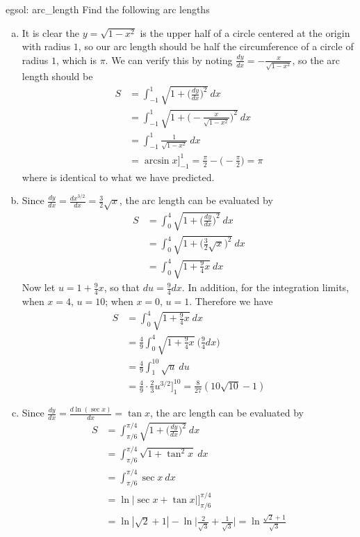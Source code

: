 \begin{egsol}[]{egsol: arc_length}
    Find the following arc lengths
    \begin{enumerate}[a)]
        \item It is clear the $y = \sqrt{1-x^2}$ is the upper half of a circle centered at the origin with radius $1$, so our arc length should be half the circumference of a circle of radius $1$, which is $\pi$.  We can verify this by noting $\frac{dy}{dx} = -\frac{x}{\sqrt{1-x^2}}$, so the arc length should be
        \begin{align*}
            S &= \int_{-1}^1 \sqrt{1+\Big(\frac{dy}{dx}\Big)^2}~dx\\
            &= \int_{-1}^1 \sqrt{1+\Big(-\frac{x}{\sqrt{1-x^2}}\Big)^2}~dx\\
            &= \int_{-1}^1 \frac{1}{\sqrt{1-x^2}}~dx\\
            &= \arcsin x\Big]_{-1}^1 = \frac{\pi}{2} - \Big(-\frac{\pi}{2}\Big) = \pi
        \end{align*}
        where is identical to what we have predicted.
        \item Since $\frac{dy}{dx} = \frac{d x^{3/2}}{dx} = \frac{3}{2} \sqrt{x}$, the arc length can be evaluated by
        \begin{align*}
            S &= \int_0^4\sqrt{1+\Big(\frac{dy}{dx}\Big)^2}~dx\\
            &= \int_0^4\sqrt{1+\big(\frac{3}{2}\sqrt{x}\big)^2}~dx\\
            &= \int_0^4\sqrt{1+\frac{9}{4}x}~dx
        \end{align*}
        Now let $u = 1+\frac{9}{4}x$, so that $du = \frac{9}{4}dx$.  In addition, for the integration limits, when $x = 4$, $u = 10$; when $x = 0$, $u = 1$.  Therefore we have
        \begin{align*}
            S &= \int_0^4\sqrt{1+\frac{9}{4}x}~dx\\
            &=\frac{4}{9} \int_0^4\sqrt{1+\frac{9}{4}x}~\Big(\frac{9}{4}dx\Big)\\
            &=\frac{4}{9}  \int_1^{10}\sqrt{u}~du\\
            &= \frac{4}{9}\cdot \frac{2}{3}u^{3/2}\Big]_1^{10} = \frac{8}{27}(10\sqrt{10}-1)
        \end{align*}
        \item Since $\frac{dy}{dx} = \frac{d \ln(\sec x)}{dx} = \tan x$, the arc length can be evaluated by
        \begin{align*}
            S &= \int_{\pi/6}^{\pi/4}\sqrt{1+\Big(\frac{dy}{dx}\Big)^2}~dx\\
            &= \int_{\pi/6}^{\pi/4}\sqrt{1+\tan^2 x}~dx\\
            &= \int_{\pi/6}^{\pi/4} \sec x~dx\\
            &= \ln|\sec x + \tan x|\big]_{\pi/6}^{\pi/4}\\
            &= \ln|\sqrt{2} + 1| - \ln\Big|\frac{2}{\sqrt{3}}+\frac{1}{\sqrt{3}}\Big| = \ln \frac{\sqrt{2}+1}{\sqrt{3}}
        \end{align*}
    \end{enumerate}
\end{egsol}


